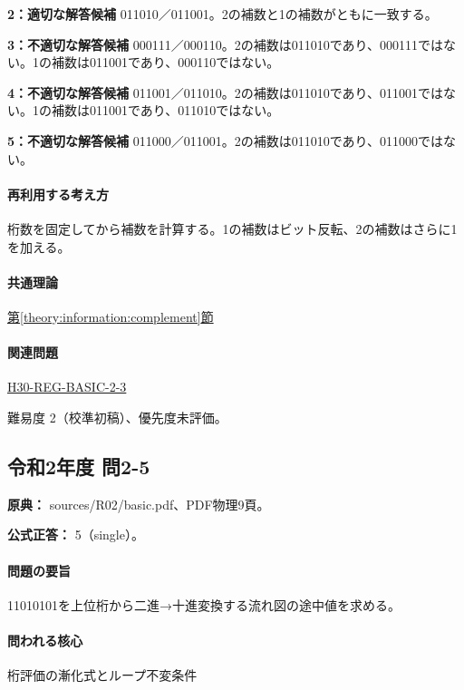 \noindent\textbf{2：適切な解答候補} 011010／011001。2の補数と1の補数がともに一致する。\par

\noindent\textbf{3：不適切な解答候補} 000111／000110。2の補数は011010であり、000111ではない。1の補数は011001であり、000110ではない。\par

\noindent\textbf{4：不適切な解答候補} 011001／011010。2の補数は011010であり、011001ではない。1の補数は011001であり、011010ではない。\par

\noindent\textbf{5：不適切な解答候補} 011000／011001。2の補数は011010であり、011000ではない。\par

\paragraph{再利用する考え方} 桁数を固定してから補数を計算する。1の補数はビット反転、2の補数はさらに1を加える。

\paragraph{共通理論} \hyperref[theory:information:complement]{第\ref*{theory:information:complement}節}

\paragraph{関連問題} \hyperref[q:h30-reg-basic-2-3]{H30-REG-BASIC-2-3}

\par 難易度 2（校準初稿）、優先度未評価。

\subsection{令和2年度 問2-5}
\label{q:r02-reg-basic-2-5}

\noindent\textbf{原典：} sources/R02/basic.pdf、PDF物理9頁。

\textbf{公式正答：} 5（single）。

\paragraph{問題の要旨} 11010101を上位桁から二進→十進変換する流れ図の途中値を求める。

\paragraph{問われる核心} 桁評価の漸化式とループ不変条件

